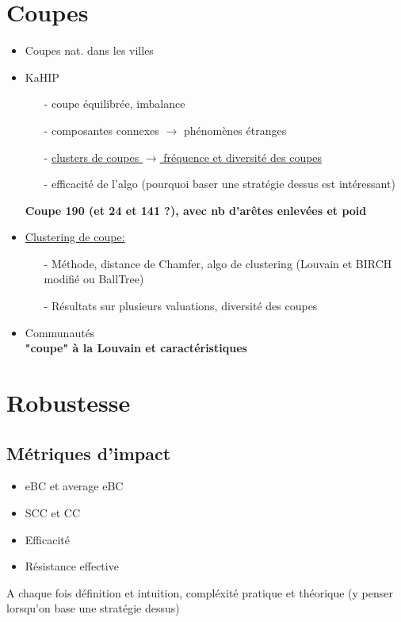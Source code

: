 \documentclass{article}
\begin{document}
\section{Coupes}
\begin{itemize}
    \item Coupes nat. dans les villes
    \item KaHIP
    \begin{itemize}
        \item[-] coupe équilibrée, imbalance
        \item[-] composantes connexes $\rightarrow$ phénomènes étranges
        \item[-] \underline{clusters de coupes $\rightarrow$ fréquence et diversité des coupes}
        \item[-] efficacité de l'algo (pourquoi baser une stratégie dessus est intéressant)
    \end{itemize}
    \textbf{Coupe 190 (et 24 et 141 ?), avec nb d'arêtes enlevées et poid}
    \item \underline{Clustering de coupe:}
    \begin{itemize}
        \item[-] Méthode, distance de Chamfer, algo de clustering (Louvain et BIRCH modifié ou BallTree)
        \item[-] Résultats sur plusieurs valuations, diversité des coupes 
    \end{itemize}
    \item Communautés\\
    \textbf{"coupe" à la Louvain et caractéristiques}
\end{itemize}

\section{Robustesse}
\subsection{Métriques d'impact}
\begin{itemize}
    \item eBC et average eBC
    \item SCC et CC
    \item Efficacité
    \item Résistance effective
\end{itemize}

A chaque fois définition et intuition, compléxité pratique et théorique (y penser lorsqu'on base une stratégie dessus)
\end{document}
